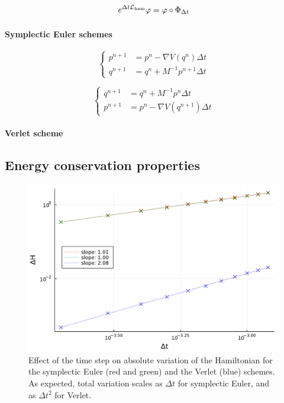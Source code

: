     $$e^{\Delta t \mathcal{L}_{\rm ham}}\varphi =\varphi \circ \Phi_{\Delta t}$$
    



    \paragraph{Symplectic Euler schemes}
    
    \begin{equation}\label{symplectic_euler_A}
    \left\{\begin{aligned}
         p^{n+1} &=p^n -\nabla V(q^n)\Delta t\\
         q^{n+1} &=q^n + M^{-1}p^{n+1}\Delta t
    \end{aligned}\right.
    \end{equation}

    \begin{equation}\label{symplectic_euler_B}
        \left\{\begin{aligned}
             q^{n+1} &=q^n +M^{-1}p^n\Delta t\\
             p^{n+1} &=p^n - \nabla V(q^{n+1})\Delta t
        \end{aligned}\right.
    \end{equation}
    
    \paragraph{Verlet scheme}

    \subsection{Energy conservation properties}

    \begin{figure}[htbp]
        \begin{center}
          \includegraphics[width=0.7\linewidth]{figures/chapter1/hamiltonian_conservation.pdf}
          \caption{ \label{fig:hamiltonian_conservation}
            Effect of the time step on absolute variation of the Hamiltonian for the symplectic Euler (red and green) and the Verlet (blue) schemes. As expected, total variation scales as $\Delta t$ for symplectic Euler, and as $\Delta t^2$ for Verlet.
          }
        \end{center}
      \end{figure}

